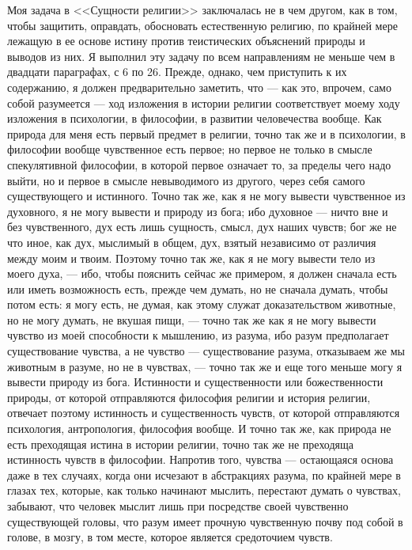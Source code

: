 \documentclass[12pt]{article}
\begin{document}
Моя задача в <<Сущности религии>> заключалась не в чем другом, как в том, чтобы защитить, оправдать, обосновать естественную религию, по крайней мере лежащую в ее основе истину против теистических объяснений природы и выводов из них. Я выполнил эту задачу по всем направлениям не меньше чем в двадцати параграфах, с 6 по 26. Прежде, однако, чем приступить к их содержанию, я должен предварительно заметить, что --- как это, впрочем, само собой разумеется --- ход изложения в истории религии соответствует моему ходу изложения в психологии, в философии, в развитии человечества вообще. Как природа для меня есть первый предмет в религии, точно так же и в психологии, в философии вообще чувственное есть первое; но первое не только в смысле спекулятивной философии, в которой первое означает то, за пределы чего надо выйти, но и первое в смысле невыводимого из другого, через себя самого существующего и истинного. Точно так же, как я не могу вывести чувственное из духовного, я не могу вывести и природу из бога; ибо духовное --- ничто вне и без чувственного, дух есть лишь сущность, смысл, дух наших чувств; бог же не что иное, как дух, мыслимый в общем, дух, взятый независимо от различия между моим и твоим. Поэтому точно так же, как я не могу вывести тело из моего духа, --- ибо, чтобы пояснить сейчас же примером, я должен сначала есть или иметь возможность есть, прежде чем думать, но не сначала думать, чтобы потом есть: я могу есть, не думая, как этому служат доказательством животные, но не могу думать, не вкушая пищи, --- точно так же как я не могу вывести чувство из моей способности к мышлению, из разума, ибо разум предполагает существование чувства, а не чувство --- существование разума, отказываем же мы животным в разуме, но не в чувствах, --- точно так же и еще того меньше могу я вывести природу из бога. Истинности и существенности или божественности природы, от которой отправляются философия религии и история религии, отвечает поэтому истинность и существенность чувств, от которой отправляются психология, антропология, философия вообще. И точно так же, как природа не есть преходящая истина в истории религии, точно так же не преходяща истинность чувств в философии. Напротив того, чувства --- остающаяся основа даже в тех случаях, когда они исчезают в абстракциях разума, по крайней мере в глазах тех, которые, как только начинают мыслить, перестают думать о чувствах, забывают, что человек мыслит лишь при посредстве своей чувственно существующей головы, что разум имеет прочную чувственную почву под собой в голове, в мозгу, в том месте, которое является средоточием чувств. 
\end{document}
